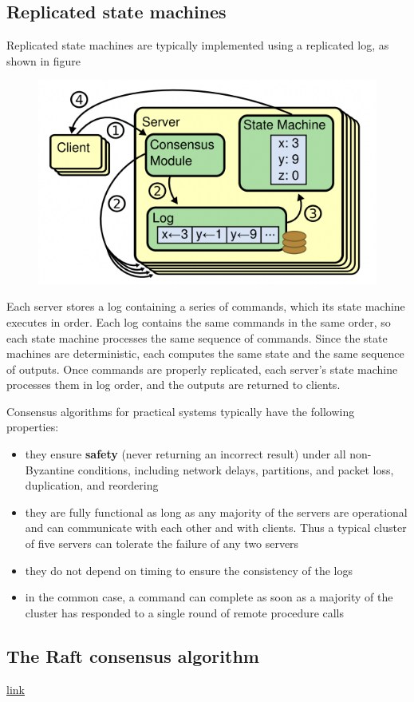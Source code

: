 \documentclass[11pt]{article}
\begin{document}
\subsection{Replicated state machines}
\label{sec:org46444f3}
Replicated state machines are typically implemented using a replicated log, as shown in figure
\begin{figure}[htbp]
\centering
\includegraphics[width=.7\textwidth]{../images/6.824/2.png}
\label{}
\end{figure}
Each server stores a log containing a series of commands, which its state machine executes in
order. Each log contains the same commands in the same order, so each state machine processes
the same sequence of commands. Since the state machines are deterministic, each computes the
same state and the same sequence of outputs. Once commands are properly replicated, each
server’s state machine processes them in log order, and the outputs are returned to clients.

Consensus algorithms for practical systems typically have the following properties:
\begin{itemize}
\item they ensure \textbf{safety} (never returning an incorrect result) under all non-Byzantine conditions,
including network delays, partitions, and packet loss, duplication, and reordering
\item they are fully functional as long as any majority of the servers are operational and can
communicate with each other and with clients. Thus a typical cluster of five servers can
tolerate the failure of any two servers
\item they do not depend on timing to ensure the consistency of the logs
\item in the common case, a command can complete as soon as a majority of the cluster has responded
to a single round of remote procedure calls
\end{itemize}
\subsection{The Raft consensus algorithm}
\label{sec:orgc247361}
\href{https://eli.thegreenplace.net/2020/implementing-raft-part-3-persistence-and-optimizations/}{link}
\end{document}
